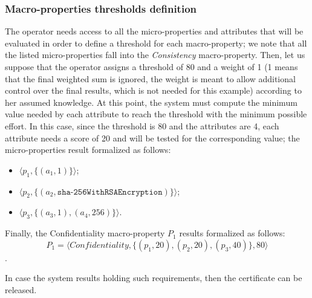 \subsubsection{Macro-properties thresholds definition}
The operator needs access to all the micro-properties and attributes that will be evaluated in order to define a threshold for each macro-property; we note that all the listed micro-properties fall into the \textit{Consistency} macro-property. Then, let us suppose that the operator assigns a threshold of 80 and a weight of 1 (1 means that the final weighted sum is ignored, the weight is meant to allow additional control over the final results, which is not needed for this example) according to her assumed knowledge. At this point, the system must compute the minimum value needed by each attribute to reach the threshold with the minimum possible effort. In this case, since the threshold is 80 and the attributes are 4, each attribute needs a score of 20 and will be tested for the corresponding value; the micro-properties result formalized as follows:
\begin{itemize}
    \item \(\langle p_1, \{ (a_1, 1 ) \} \rangle\);
    \item \(\langle p_2, \{(a_2, \texttt{sha-256WithRSAEncryption})\} \rangle\);
    \item \(\langle p_3, \{(a_3, 1), (a_4, 256)\} \rangle\).
\end{itemize}

Finally, the Confidentiality macro-property \(P_1\) results formalized as follows: \[P_1 = \langle Confidentiality, \{ (p_1, 20), (p_2, 20), (p_3, 40) \}, 80 \rangle\].

In case the system results holding such requirements, then the certificate can be released.



